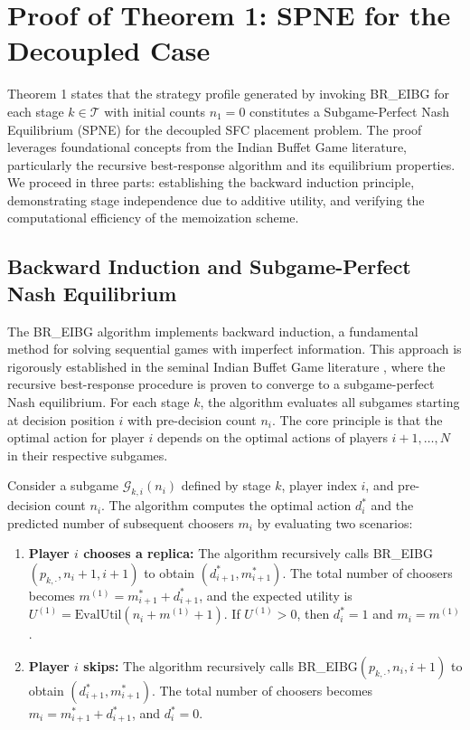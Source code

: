 \documentclass[journal]{IEEEtran}
\theoremstyle{plain}
\theoremstyle{definition}
\theoremstyle{remark}
\begin{document}
\appendices
\section{Proof of Theorem 1: SPNE for the Decoupled Case}
\label{app:proof_thm1}

Theorem 1 states that the strategy profile generated by invoking \textsf{BR\_EIBG} for each stage $k \in \mathcal{T}$ with initial counts $n_1=0$ constitutes a Subgame-Perfect Nash Equilibrium (SPNE) for the decoupled SFC placement problem. The proof leverages foundational concepts from the Indian Buffet Game literature, particularly the recursive best-response algorithm and its equilibrium properties. We proceed in three parts: establishing the backward induction principle, demonstrating stage independence due to additive utility, and verifying the computational efficiency of the memoization scheme.

\subsection{Backward Induction and Subgame-Perfect Nash Equilibrium}
\label{app:proof_thm1_sec1}

The \textsf{BR\_EIBG} algorithm implements backward induction, a fundamental method for solving sequential games with imperfect information. This approach is rigorously established in the seminal Indian Buffet Game literature \cite{jiang2015indian}, where the recursive best-response procedure is proven to converge to a subgame-perfect Nash equilibrium. For each stage $k$, the algorithm evaluates all subgames starting at decision position $i$ with pre-decision count $n_i$. The core principle is that the optimal action for player $i$ depends on the optimal actions of players $i+1, \dots, N$ in their respective subgames.

Consider a subgame $\mathcal{G}_{k,i}(n_i)$ defined by stage $k$, player index $i$, and pre-decision count $n_i$. The algorithm computes the optimal action $d_i^*$ and the predicted number of subsequent choosers $m_i$ by evaluating two scenarios:
\begin{enumerate}
    \item \textbf{Player $i$ chooses a replica:} The algorithm recursively calls \textsf{BR\_EIBG}$(p_{k,\cdot}, n_i+1, i+1)$ to obtain $(d_{i+1}^*, m_{i+1}^*)$. The total number of choosers becomes $m^{(1)} = m_{i+1}^* + d_{i+1}^*$, and the expected utility is $U^{(1)} = \text{EvalUtil}(n_i + m^{(1)} + 1)$. If $U^{(1)} > 0$, then $d_i^* = 1$ and $m_i = m^{(1)}$.
    \item \textbf{Player $i$ skips:} The algorithm recursively calls \textsf{BR\_EIBG}$(p_{k,\cdot}, n_i, i+1)$ to obtain $(d_{i+1}^*, m_{i+1}^*)$. The total number of choosers becomes $m_i = m_{i+1}^* + d_{i+1}^*$, and $d_i^* = 0$.
\end{enumerate}
\end{document}
